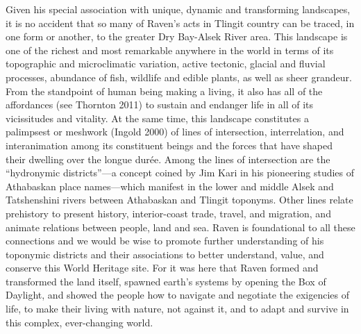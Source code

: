 Given his special association with unique, dynamic and transforming landscapes, it is no accident that so many of Raven’s acts in Tlingit country can be traced, in one form or another, to the greater Dry Bay-Alsek River area.  This landscape is one of the richest and most remarkable anywhere in the world in terms of its topographic and microclimatic variation, active tectonic, glacial and fluvial processes, abundance of fish, wildlife and edible plants, as well as sheer grandeur.  From the standpoint of human being making a living, it also has all of the affordances (see Thornton 2011) to sustain and endanger life in all of its vicissitudes and vitality. At the same time, this landscape constitutes a palimpsest or meshwork (Ingold 2000) of lines of intersection, interrelation, and interanimation among its constituent beings and the forces that have shaped their dwelling over the longue durée.  Among the lines of intersection are the “hydronymic districts”---a concept coined by Jim Kari in his pioneering studies of Athabaskan place names---which manifest in the lower and middle Alsek and Tatshenshini rivers between Athabaskan and Tlingit toponyms.  Other lines relate prehistory to present history, interior-coast trade, travel, and migration, and animate relations between people, land and sea.  Raven is foundational to all these connections and we would be wise to promote further understanding of his toponymic districts and their associations to better understand, value, and conserve this World Heritage site.  For it was here that Raven formed and transformed the land itself, spawned earth’s systems by opening the Box of Daylight, and showed the people how to navigate and negotiate the exigencies of life, to make their living with nature, not against it, and to adapt and survive in this complex, ever-changing world.

